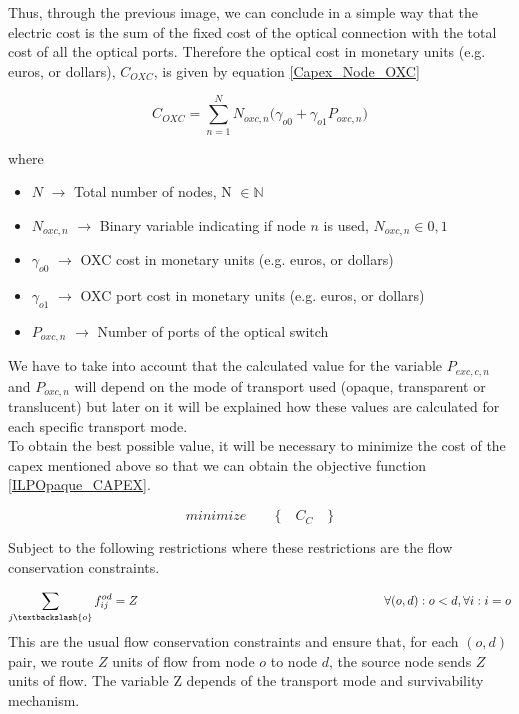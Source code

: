 Thus, through the previous image, we can conclude in a simple way that the electric cost is the sum of the fixed cost of the optical connection with the total cost of all the optical ports.
Therefore the optical cost in monetary units (e.g. euros, or dollars), $C_{OXC}$, is given by equation \ref{Capex_Node_OXC}

\begin{equation}
C_{OXC} = \sum_{n=1}^{N} N_{oxc,n} \bigg( \gamma_{o0} + \gamma_{o1} P_{oxc,n} \bigg)
\label{Capex_Node_OXC}
\end{equation}

\noindent
where
\begin{itemize}
\item{$N$				$\rightarrow$	Total number of nodes, N $\in \mathbb{N}$}
\item{$N_{oxc,n}$		$\rightarrow$	Binary variable indicating if node $n$ is used, $N_{oxc,n} \in {0, 1}$}
\item{$\gamma_{o0}$ 	$\rightarrow$	OXC cost in monetary units (e.g. euros, or dollars)}
\item{$\gamma_{o1}$ 	$\rightarrow$	OXC port cost in monetary units (e.g. euros, or dollars) }
\item{$P_{oxc,n}$	    $\rightarrow$	Number of ports of the optical switch}
\end{itemize}


\vspace{10pt}
We have to take into account that the calculated value for the variable $P_{exc,c,n}$ and $P_{oxc,n}$ will depend on the mode of transport used (opaque, transparent or translucent) but later on it will be explained how these values are calculated for each specific transport mode.\\

To obtain the best possible value, it will be necessary to minimize the cost of the capex mentioned above so that we can obtain the objective function \ref{ILPOpaque_CAPEX}.

\begin{equation}
minimize \qquad \Big\{ \quad C_C \quad \Big\}
\label{ILPOpaque_CAPEX}
\end{equation}

\vspace{11pt}
\noindent
Subject to the following restrictions where these restrictions are the flow conservation constraints.

\begin{equation}
\sum_{j\textbackslash \{o\}} f_{ij}^{od} = Z  \qquad \qquad \qquad \qquad \qquad \qquad \qquad \qquad \qquad \qquad
\forall(o,d) : o < d, \forall i: i = o
\label{ILPOpaque1_CAPEX}
\end{equation}
\noindent
This are the usual flow conservation constraints and ensure that, for each $(o,d)$ pair, we route $Z$ units of flow from node $o$ to node $d$, the source node sends $Z$ units of flow. The variable Z depends of the transport mode and survivability mechanism.

